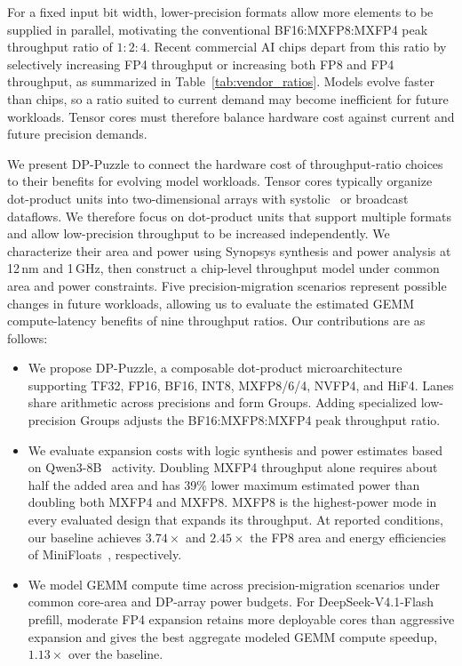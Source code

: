 \documentclass[conference,10pt,letterpaper]{IEEEtran}
\begin{document}
For a fixed input bit width, lower-precision formats allow more elements to be supplied in parallel, motivating the conventional BF16:MXFP8:MXFP4 peak throughput ratio of $1:2:4$. Recent commercial AI chips depart from this ratio by selectively increasing FP4 throughput or increasing both FP8 and FP4 throughput, as summarized in Table~\ref{tab:vendor_ratios}. Models evolve faster than chips, so a ratio suited to current demand may become inefficient for future workloads. Tensor cores must therefore balance hardware cost against current and future precision demands.

We present DP-Puzzle to connect the hardware cost of throughput-ratio choices to their benefits for evolving model workloads. Tensor cores typically organize dot-product units into two-dimensional arrays with systolic~\cite{jouppi2017tpu} or broadcast dataflows. We therefore focus on dot-product units that support multiple formats and allow low-precision throughput to be increased independently. We characterize their area and power using Synopsys synthesis and power analysis at 12\,nm and 1\,GHz, then construct a chip-level throughput model under common area and power constraints. Five precision-migration scenarios represent possible changes in future workloads, allowing us to evaluate the estimated GEMM compute-latency benefits of nine throughput ratios.
Our contributions are as follows:
\begin{itemize}
\item We propose DP-Puzzle, a composable dot-product microarchitecture supporting TF32, FP16, BF16, INT8, MXFP8/6/4, NVFP4, and HiF4. Lanes share arithmetic across precisions and form Groups. Adding specialized low-precision Groups adjusts the BF16:MXFP8:MXFP4 peak throughput ratio.
\item We evaluate expansion costs with logic synthesis and power estimates based on Qwen3-8B~\cite{qwen3technicalreport} activity. Doubling MXFP4 throughput alone requires about half the added area and has 39\% lower maximum estimated power than doubling both MXFP4 and MXFP8. MXFP8 is the highest-power mode in every evaluated design that expands its throughput. At reported conditions, our baseline achieves $3.74\times$ and $2.45\times$ the FP8 area and energy efficiencies of MiniFloats~\cite{bertaccini2024minifloats}, respectively.
\item We model GEMM compute time across precision-migration scenarios under common core-area and DP-array power budgets. For DeepSeek-V4.1-Flash prefill, moderate FP4 expansion retains more deployable cores than aggressive expansion and gives the best aggregate modeled GEMM compute speedup, $1.13\times$ over the baseline.
\end{itemize}
\end{document}
